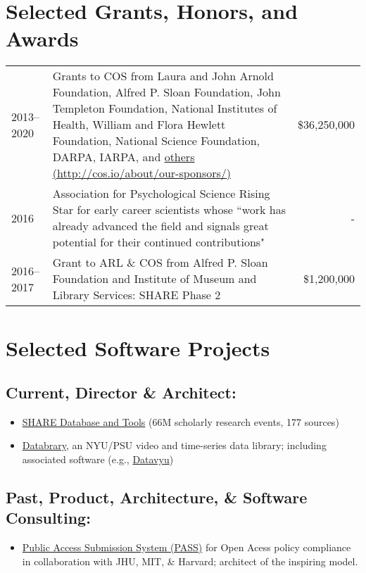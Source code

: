 \documentclass[11pt]{article}
\begin{document}

\section*{Selected Grants, Honors, and Awards}
\begin{tabularx}{\textwidth}{lXr}
2013--2020 	& Grants to COS from Laura and John Arnold Foundation, Alfred P. Sloan Foundation, John Templeton Foundation, National Institutes of Health, William and Flora Hewlett Foundation, National Science Foundation, DARPA, IARPA, and \href{http://cos.io/about/our-sponsors/}{others (http://cos.io/about/our-sponsors/)} & \$36,250,000 \\
2016			& Association for Psychological Science Rising Star for early career scientists whose ``work has already advanced the field and signals great potential for their continued contributions" & - \\
2016--2017		& Grant to ARL \& COS from Alfred P. Sloan Foundation and Institute of Museum and Library Services: SHARE Phase 2 & \$1,200,000 \\
\end{tabularx}

\begin{publications}
\end{publications}

\section*{Selected Software Projects}

\subsection{Current, Director \& Architect:}
\begin{itemize}
	\item \href{http://share.osf.io}{SHARE Database and Tools} (66M scholarly research events, 177 sources)
	\item \href{http://databrary.org}{Databrary}, an NYU/PSU video and time-series data library; including associated software (e.g., \href{http://datavyu.org}{Datavyu})
\end{itemize}

\subsection{Past, Product, Architecture, \& Software Consulting:}
\begin{itemize}
	\item \href{https://github.com/oa-pass}{Public Access Submission System (PASS)} for Open Acess policy compliance in collaboration with JHU, MIT, \& Harvard; architect of the inspiring model.
\end{itemize}
\end{document}
